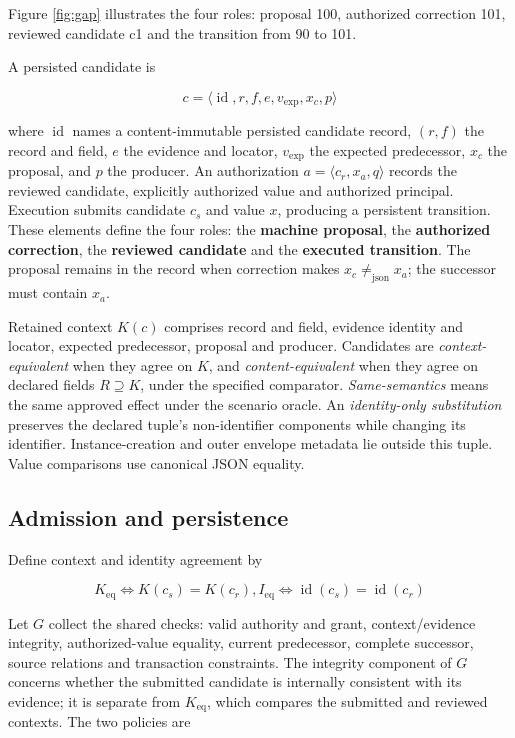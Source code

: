Figure \ref{fig:gap} illustrates the four roles: proposal 100, authorized correction 101, reviewed candidate c1 and the transition from 90 to 101.

A persisted candidate is

\[
c = \langle \operatorname{id}, r, f, e, v_{\mathrm{exp}}, x_c, p\rangle
\]

where \(\operatorname{id}\) names a content-immutable persisted candidate record, \((r,f)\) the record and field, \(e\) the evidence and locator, \(v_{\mathrm{exp}}\) the expected predecessor, \(x_c\) the proposal, and \(p\) the producer. An authorization \(a = \langle c_r, x_a, q\rangle\) records the reviewed candidate, explicitly authorized value and authorized principal. Execution submits candidate \(c_s\) and value \(x\), producing a persistent transition. These elements define the four roles: the \textbf{machine proposal}, the \textbf{authorized correction}, the \textbf{reviewed candidate} and the \textbf{executed transition}. The proposal remains in the record when correction makes \(x_c \ne _{\mathrm{json}} x_a\); the successor must contain \(x_a\).

Retained context \(K(c)\) comprises record and field, evidence identity and locator, expected predecessor, proposal and producer. Candidates are \emph{context-equivalent} when they agree on \(K\), and \emph{content-equivalent} when they agree on declared fields \(R\supseteq K\), under the specified comparator. \emph{Same-semantics} means the same approved effect under the scenario oracle. An \emph{identity-only substitution} preserves the declared tuple's non-identifier components while changing its identifier. Instance-creation and outer envelope metadata lie outside this tuple. Value comparisons use canonical JSON equality.

\subsection{Admission and persistence}\label{admission-and-persistence}

Define context and identity agreement by

\[
K_{\mathrm{eq}} \Leftrightarrow  K(c_s) = K(c_r),   I_{\mathrm{eq}} \Leftrightarrow  \operatorname{id}(c_s) = \operatorname{id}(c_r)
\]

Let \(G\) collect the shared checks: valid authority and grant, context/evidence integrity, authorized-value equality, current predecessor, complete successor, source relations and transaction constraints. The integrity component of \(G\) concerns whether the submitted candidate is internally consistent with its evidence; it is separate from \(K_{\mathrm{eq}}\), which compares the submitted and reviewed contexts. The two policies are


